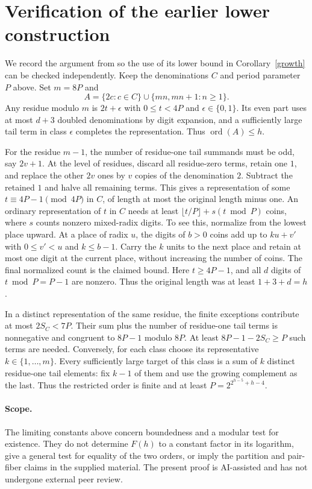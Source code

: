 \documentclass[11pt]{article}
\newcommand{\ord}{\operatorname{ord}}
\begin{document}
\section*{Verification of the earlier lower construction}
We record the argument from \cite[Sec.~4]{Gao} so the use of its lower bound in Corollary~\ref{growth} can be checked independently. Keep the denominations $C$ and period parameter $P$ above. Set $m=8P$ and
\[
 A=\{2c:c\in C\}\cup\{mn,mn+1:n\ge1\}.
\]
Any residue modulo $m$ is $2t+\epsilon$ with $0\le t<4P$ and $\epsilon\in\{0,1\}$. Its even part uses at most $d+3$ doubled denominations by digit expansion, and a sufficiently large tail term in class $\epsilon$ completes the representation. Thus $\ord(A)\le h$.

For the residue $m-1$, the number of residue-one tail summands must be odd, say $2v+1$. At the level of residues, discard all residue-zero terms, retain one $1$, and replace the other $2v$ ones by $v$ copies of the denomination $2$. Subtract the retained $1$ and halve all remaining terms. This gives a representation of some $t\equiv4P-1\pmod{4P}$ in $C$, of length at most the original length minus one. An ordinary representation of $t$ in $C$ needs at least $\lfloor t/P\rfloor+s(t\bmod P)$ coins, where $s$ counts nonzero mixed-radix digits. To see this, normalize from the lowest place upward. At a place of radix $u$, the digits of $b>0$ coins add up to $ku+v'$ with $0\le v'<u$ and $k\le b-1$. Carry the $k$ units to the next place and retain at most one digit at the current place, without increasing the number of coins. The final normalized count is the claimed bound. Here $t\ge4P-1$, and all $d$ digits of $t\bmod P=P-1$ are nonzero. Thus the original length was at least $1+3+d=h$.

In a distinct representation of the same residue, the finite exceptions contribute at most $2S_C<7P$. Their sum plus the number of residue-one tail terms is nonnegative and congruent to $8P-1$ modulo $8P$. At least $8P-1-2S_C\ge P$ such terms are needed. Conversely, for each class choose its representative $k\in\{1,\ldots,m\}$. Every sufficiently large target of this class is a sum of $k$ distinct residue-one tail elements: fix $k-1$ of them and use the growing complement as the last. Thus the restricted order is finite and at least $P=2^{2^{h-5}+h-4}$.

\paragraph{Scope.} The limiting constants above concern boundedness and a modular test for existence. They do not determine $F(h)$ to a constant factor in its logarithm, give a general test for equality of the two orders, or imply the partition and pair-fiber claims in the supplied material. The present proof is AI-assisted and has not undergone external peer review.
\end{document}

